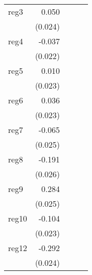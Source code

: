 {\begin{longtable}{l*{4}{D{.}{.}{-1}}}
\addlinespace
reg3        &       0.050\sym{*}  &                     &                     &                     \\
            &     (0.024)         &                     &                     &                     \\
\addlinespace
reg4        &      -0.037         &                     &                     &                     \\
            &     (0.022)         &                     &                     &                     \\
\addlinespace
reg5        &       0.010         &                     &                     &                     \\
            &     (0.023)         &                     &                     &                     \\
\addlinespace
reg6        &       0.036         &                     &                     &                     \\
            &     (0.023)         &                     &                     &                     \\
\addlinespace
reg7        &      -0.065\sym{**} &                     &                     &                     \\
            &     (0.025)         &                     &                     &                     \\
\addlinespace
reg8        &      -0.191\sym{***}&                     &                     &                     \\
            &     (0.026)         &                     &                     &                     \\
\addlinespace
reg9        &       0.284\sym{***}&                     &                     &                     \\
            &     (0.025)         &                     &                     &                     \\
\addlinespace
reg10       &      -0.104\sym{***}&                     &                     &                     \\
            &     (0.023)         &                     &                     &                     \\
\addlinespace
reg12       &      -0.292\sym{***}&                     &                     &                     \\
            &     (0.024)         &                     &                     &                     \\

\end{longtable}}
